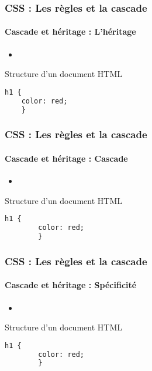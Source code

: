 \documentclass[xcolor=table]{beamer}
\begin{document}
\begin{frame}[fragile]
\frametitle{CSS : Les règles et la cascade}
\framesubtitle{Cascade et héritage : L'héritage}

\begin{minipage}{0.60\textwidth}
\begin{itemize}
	\item 
\end{itemize}
\end{minipage}
%
\begin{minipage}{0.38\textwidth}
\begin{block}{Structure d'un document HTML}
	\lstset{escapeinside=**}
	\scriptsize\bfseries
	\begin{lstlisting}[language={html}]
	h1 {
	color: red;
	}
	\end{lstlisting}
\end{block}
\end{minipage}
\end{frame}

\begin{frame}[fragile]
\frametitle{CSS : Les règles et la cascade}
\framesubtitle{Cascade et héritage : Cascade}

\begin{minipage}{0.60\textwidth}
	\begin{itemize}
		\item 
	\end{itemize}
\end{minipage}
%
\begin{minipage}{0.38\textwidth}
	\begin{block}{Structure d'un document HTML}
		\lstset{escapeinside=**}
		\scriptsize\bfseries
		\begin{lstlisting}[language={html}]
		h1 {
		color: red;
		}
		\end{lstlisting}
	\end{block}
\end{minipage}
\end{frame}

\begin{frame}[fragile]
\frametitle{CSS : Les règles et la cascade}
\framesubtitle{Cascade et héritage : Spécificité}

\begin{minipage}{0.60\textwidth}
	\begin{itemize}
		\item 
	\end{itemize}
\end{minipage}
%
\begin{minipage}{0.38\textwidth}
	\begin{block}{Structure d'un document HTML}
		\lstset{escapeinside=**}
		\scriptsize\bfseries
		\begin{lstlisting}[language={html}]
		h1 {
		color: red;
		}
		\end{lstlisting}
	\end{block}
\end{minipage}
\end{frame}
\end{document}
